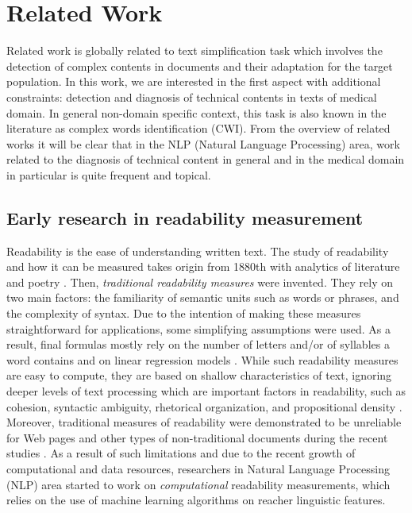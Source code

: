 \chapter{Related Work}
\label{ch:related-work}

Related work is globally related to text simplification task which involves the detection of complex contents in documents and their adaptation for the target population. In this work, we are interested in the first aspect with additional constraints: detection and diagnosis of technical contents in texts of medical domain. In general non-domain specific context, this task is also known in the literature as complex words identification (CWI). From the overview of related works it will be clear that in the NLP (Natural Language Processing) area, work related to the diagnosis of technical content in general and in the medical domain in particular is quite frequent and topical. 


\section{Early research in readability measurement}

Readability is the ease of understanding written text. The study of readability and how it can be measured takes origin from 1880th with analytics of literature and poetry \citep{Sherman-1893}. Then,  \textit{traditional readability measures} were invented. They rely on two main factors: the familiarity of semantic units such as words or
phrases, and the complexity of syntax. Due to the intention of making these measures straightforward for applications, some simplifying assumptions were used. As a result, final formulas mostly rely on the number of letters and/or of syllables a word contains and on linear regression models \citep{Flesch1948,Gunning1973}. While such readability measures are easy to compute, they are based on shallow characteristics of text, ignoring deeper levels of text processing which are important factors in readability, such as cohesion, syntactic ambiguity, rhetorical organization, and propositional density \citep{Collins-2014}. Moreover, traditional measures of readability were demonstrated to be unreliable for Web pages and other types of non-traditional documents during the recent studies \citep{Si-2001}. As a result of such limitations and due to the recent growth of computational and data resources,  researchers in Natural Language Processing (NLP) area started to work on \textit{computational} readability measurements, which relies on the use of machine learning algorithms on reacher linguistic features.


